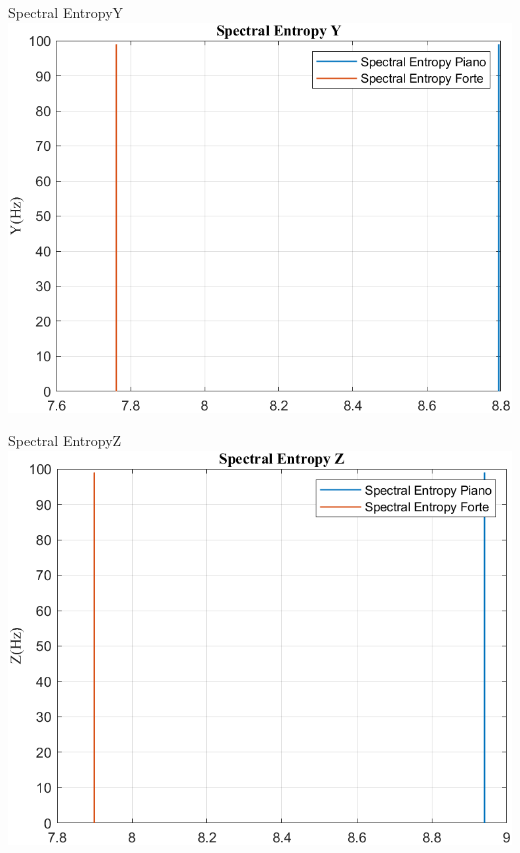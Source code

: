 	\begin{frame}{{Spectral EntropyY}}
		\centering\includegraphics[height=.8\textheight]{figure/Acc/Trasformata/Spectral EntropyY}
	\end{frame}
	
	\begin{frame}{{Spectral EntropyZ}}
		\centering\includegraphics[height=.8\textheight]{figure/Acc/Trasformata/Spectral EntropyZ}
	\end{frame}
	

